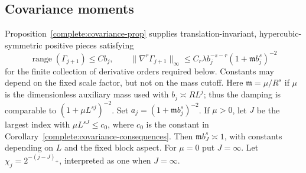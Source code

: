 \documentclass[11pt]{article}
\begin{document}
\subsection{Covariance moments}
\label{completion:map-support}
Proposition~\ref{complete:covariance-prop} supplies
translation-invariant, hypercubic-symmetric positive pieces satisfying
\[
 \operatorname{range}(\Gamma_{j+1})\le Cb_j,\qquad
 \|\nabla^r\Gamma_{j+1}\|_\infty
 \le C_r\lambda b_j^{-s-r}(1+\mathfrak m b_j^s)^{-2}
\]
for the finite collection of derivative orders required below. Constants
may depend on the fixed scale factor, but not on the mass cutoff.
Here \(\mathfrak m=\mu/R^s\) if \(\mu\) is the dimensionless
auxiliary mass used with \(b_j\asymp RL^j\); thus the damping is comparable to
\((1+\mu L^{sj})^{-2}\). Set \(a_j=(1+\mathfrak m b_j^s)^{-2}\). If \(\mu>0\), let
\(J\) be the largest index with \(\mu L^{sJ}\le c_0\), where
\(c_0\) is the constant in Corollary~\ref{complete:covariance-consequences}.
Then \(\mathfrak m b_J^s\asymp1\), with constants depending on
\(L\) and the fixed block aspect. For \(\mu=0\) put \(J=\infty\).
Let \(\chi_j=2^{-(j-J)_+}\), interpreted as one when \(J=\infty\).
\end{document}
